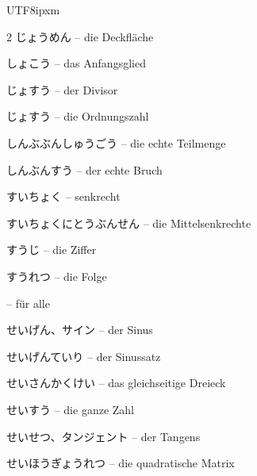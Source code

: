 \begin{CJK}{UTF8}{ipxm}
\begin{multicols}{2}
 {\footnotesize\color{black!70}じょうめん} -- die Deckfläche\dotfill\hyperref[e:249]{\pageref*{e:249}}\par
{} {\footnotesize\color{black!70}しょこう} -- das Anfangsglied\dotfill\hyperref[e:261]{\pageref*{e:261}}\par
{} {\footnotesize\color{black!70}じょすう} -- der Divisor\dotfill\hyperref[e:27]{\pageref*{e:27}}\par
{} {\footnotesize\color{black!70}じょすう} -- die Ordnungszahl\dotfill\hyperref[e:3]{\pageref*{e:3}}\par
{} {\footnotesize\color{black!70}しんぶぶんしゅうごう} -- die echte Teilmenge\dotfill\hyperref[e:99]{\pageref*{e:99}}\par
{} {\footnotesize\color{black!70}しんぶんすう} -- der echte Bruch\dotfill\hyperref[e:31]{\pageref*{e:31}}\par
{} {\footnotesize\color{black!70}すいちょく} -- senkrecht\dotfill\hyperref[e:151]{\pageref*{e:151}}\par
{} {\footnotesize\color{black!70}すいちょくにとうぶんせん} -- die Mittelsenkrechte\dotfill\hyperref[e:170]{\pageref*{e:170}}\par
{} {\footnotesize\color{black!70}すうじ} -- die Ziffer\dotfill\hyperref[e:2]{\pageref*{e:2}}\par
{} {\footnotesize\color{black!70}すうれつ} -- die Folge\dotfill\hyperref[e:257]{\pageref*{e:257}}\par
{} -- für alle\dotfill\hyperref[e:352]{\pageref*{e:352}}\par
{} {\footnotesize\color{black!70}せいげん、サイン} -- der Sinus\dotfill\hyperref[e:132]{\pageref*{e:132}}\par
{} {\footnotesize\color{black!70}せいげんていり} -- der Sinussatz\dotfill\hyperref[e:140]{\pageref*{e:140}}\par
{} {\footnotesize\color{black!70}せいさんかくけい} -- das gleichseitige Dreieck\dotfill\hyperref[e:185]{\pageref*{e:185}}\par
{} {\footnotesize\color{black!70}せいすう} -- die ganze Zahl\dotfill\hyperref[e:6]{\pageref*{e:6}}\par
{} {\footnotesize\color{black!70}せいせつ、タンジェント} -- der Tangens\dotfill\hyperref[e:134]{\pageref*{e:134}}\par
{} {\footnotesize\color{black!70}せいほうぎょうれつ} -- die quadratische Matrix\dotfill\hyperref[e:321]{\pageref*{e:321}}\par

\end{multicols}
\end{CJK}
